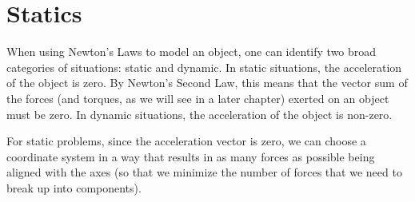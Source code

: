 \section{Statics}
When using Newton's Laws to model an object, one can identify two broad categories of situations: static and dynamic. In static situations, the acceleration of the object is zero. By Newton's Second Law, this means that the vector sum of the forces (and torques, as we will see in a later chapter) exerted on an object must be zero. In dynamic situations, the acceleration of the object is non-zero. 

For static problems, since the acceleration vector is zero, we can choose a coordinate system in a way that results in as many forces as possible being aligned with the axes (so that we minimize the number of forces that we need to break up into components).

